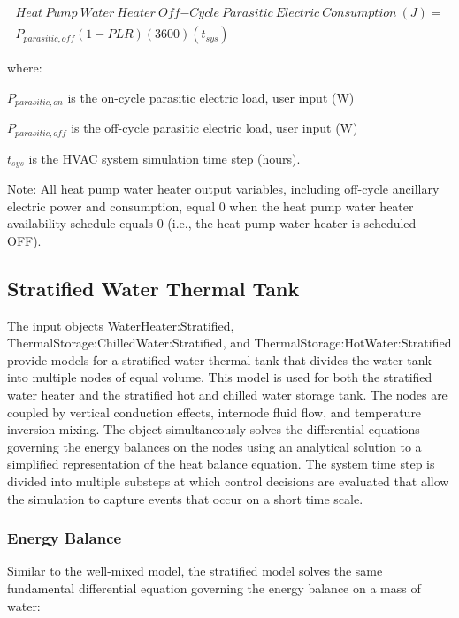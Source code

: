 \begin{equation}
\begin{split}
Heat~Pump~Water~Heater~Off{\mathrm{ - }}Cycle~Parasitic~Electric~Consumption~(J) = \\{P_{parasitic,off}}\left( {1 - PLR} \right)\left( {3600} \right)\left( {{t_{sys}}} \right)
\end{split}
\end{equation}

where:

\({P_{parasitic,on}}\) is the on-cycle parasitic electric load, user input (W)

\({P_{parasitic,off}}\) is the off-cycle parasitic electric load, user input (W)

\({t_{sys}}\) is the HVAC system simulation time step (hours).

Note: All heat pump water heater output variables, including off-cycle ancillary electric power and consumption, equal 0 when the heat pump water heater availability schedule equals 0 (i.e., the heat pump water heater is scheduled OFF).

\subsection{Stratified Water Thermal Tank}\label{stratified-water-thermal-tank}

The input objects WaterHeater:Stratified,
ThermalStorage:ChilledWater:Stratified, and ThermalStorage:HotWater:Stratified
provide models for a stratified water thermal tank that divides the water tank
into multiple nodes of equal volume. This model is used for both the stratified
water heater and the stratified hot and chilled water storage tank. The nodes are
coupled by vertical conduction effects, internode fluid flow, and temperature
inversion mixing. The object simultaneously solves the differential equations
governing the energy balances on the nodes using an analytical solution to a
simplified representation of the heat balance equation. The system time step is
divided into multiple substeps at which control decisions are evaluated that
allow the simulation to capture events that occur on a short time scale.

\subsubsection{Energy Balance}\label{energy-balance-1}

Similar to the well-mixed model, the stratified model solves the same fundamental differential equation governing the energy balance on a mass of water:


